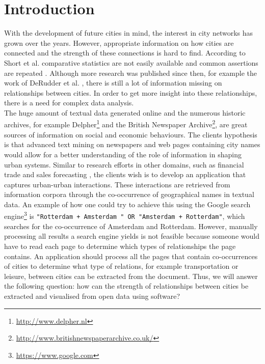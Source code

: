 \section{Introduction}
With the development of future cities in mind, the interest in city networks has grown over the years. However, appropriate information on how cities are connected and the strength of these connections is hard to find. According to Short et al. comparative statistics are not easily available and common assertions are repeated \cite{short1996dirty}. Although more research was published since then, for example the work of DeRudder et al. \cite{derudder2005appraisal}, there is still a lot of information missing on relationships between cities.
 In order to get more insight into these relationships, there is a need for complex data analysis. \\

The huge amount of textual data generated online and the numerous historic archives, for example Delpher\footnote{\url{http://www.delpher.nl}} and the British Newspaper Archive\footnote{\url{http://www.britishnewspaperarchive.co.uk/}}, are great sources of information on social and economic behaviours. The clients hypothesis is that advanced text mining on newspapers and web pages containing city names would allow for a better understanding of the role of information in shaping urban systems. Similar to research efforts in other domains, such as financial trade \cite{preis2013quantifying} and sales forecasting \cite{wu2014future}, the clients wish is to develop an application that captures urban-urban interactions. These interactions are retrieved from information corpora through the co-occurrence of geographical names in textual data. An example of how one could try to achieve this using  the Google search engine\footnote{\url{https://www.google.com}} is \texttt{"Rotterdam + Amsterdam " OR "Amsterdam + Rotterdam"}, which searches for the co-occurrence of Amsterdam and Rotterdam. However, manually processing all results a search engine yields is not feasible because someone would have to read each page to determine which types of relationships the page contains. An application should process all the pages that contain co-occurrences of cities to determine what type of relations, for example transportation or leisure, between cities can be extracted from the document. Thus, we will answer the following question: 
how can the strength of relationships between cities be extracted and visualised from open data using software? \\

